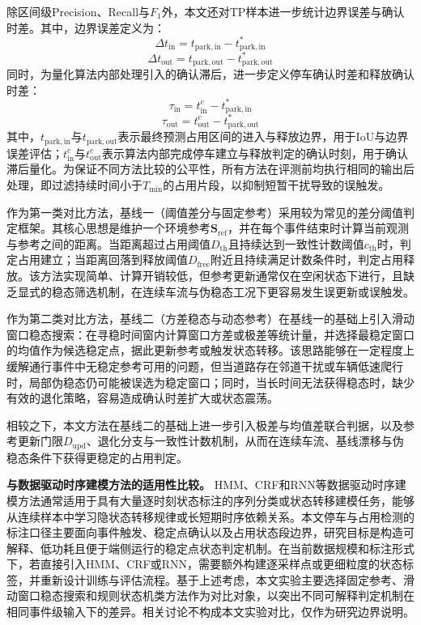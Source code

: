 \documentclass{xdupgthesis}
\begin{document}
除区间级Precision、Recall与$F_1$外，本文还对TP样本进一步统计边界误差与确认时差。其中，边界误差定义为：
\begin{equation}
    \Delta t_{\mathrm{in}}=t_{\mathrm{park,in}}-t^{*}_{\mathrm{park,in}}
\end{equation}
\begin{equation}
    \Delta t_{\mathrm{out}}=t_{\mathrm{park,out}}-t^{*}_{\mathrm{park,out}}
\end{equation}
同时，为量化算法内部处理引入的确认滞后，进一步定义停车确认时差和释放确认时差：
\begin{equation}
    \tau_{\mathrm{in}}=t^{c}_{\mathrm{in}}-t^{*}_{\mathrm{park,in}}
\end{equation}
\begin{equation}
    \tau_{\mathrm{out}}=t^{c}_{\mathrm{out}}-t^{*}_{\mathrm{park,out}}
\end{equation}
其中，$t_{\mathrm{park,in}}$与$t_{\mathrm{park,out}}$表示最终预测占用区间的进入与释放边界，用于IoU与边界误差评估；$t^{c}_{\mathrm{in}}$与$t^{c}_{\mathrm{out}}$表示算法内部完成停车建立与释放判定的确认时刻，用于确认滞后量化。为保证不同方法比较的公平性，所有方法在评测前均执行相同的输出后处理，即过滤持续时间小于$T_{\min}$的占用片段，以抑制短暂干扰导致的误触发。



作为第一类对比方法，基线一（阈值差分与固定参考）采用较为常见的差分阈值判定框架。其核心思想是维护一个环境参考$\mathbf{S}_{\mathrm{ref}}$，并在每个事件结束时计算当前观测与参考之间的距离。当距离超过占用阈值$D_{\mathrm{th}}$且持续达到一致性计数阈值$c_{\mathrm{th}}$时，判定占用建立；当距离回落到释放阈值$D_{\mathrm{free}}$附近且持续满足计数条件时，判定占用释放。该方法实现简单、计算开销较低，但参考更新通常仅在空闲状态下进行，且缺乏显式的稳态筛选机制，在连续车流与伪稳态工况下更容易发生误更新或误触发。

作为第二类对比方法，基线二（方差稳态与动态参考）在基线一的基础上引入滑动窗口稳态搜索：在寻稳时间窗内计算窗口方差或极差等统计量，并选择最稳定窗口的均值作为候选稳定点，据此更新参考或触发状态转移。该思路能够在一定程度上缓解通行事件中无稳定参考可用的问题，但当道路存在邻道干扰或车辆低速爬行时，局部伪稳态仍可能被误选为稳定窗口；同时，当长时间无法获得稳态时，缺少有效的退化策略，容易造成确认时差扩大或状态震荡。

相较之下，本文方法在基线二的基础上进一步引入极差与均值差联合判据，以及参考更新门限$D_{\mathrm{upd}}$、退化分支与一致性计数机制，从而在连续车流、基线漂移与伪稳态条件下获得更稳定的占用判定。

\noindent\textbf{与数据驱动时序建模方法的适用性比较。}
HMM、CRF和RNN等数据驱动时序建模方法通常适用于具有大量逐时刻状态标注的序列分类或状态转移建模任务，能够从连续样本中学习隐状态转移规律或长短期时序依赖关系。本文停车与占用检测的标注口径主要面向事件触发、稳定点确认以及占用状态段边界，研究目标是构造可解释、低功耗且便于端侧运行的稳定点状态判定机制。在当前数据规模和标注形式下，若直接引入HMM、CRF或RNN，需要额外构建逐采样点或更细粒度的状态标签，并重新设计训练与评估流程。基于上述考虑，本文实验主要选择固定参考、滑动窗口稳态搜索和规则状态机类方法作为对比对象，以突出不同可解释判定机制在相同事件级输入下的差异。相关讨论不构成本文实验对比，仅作为研究边界说明。
\end{document}
